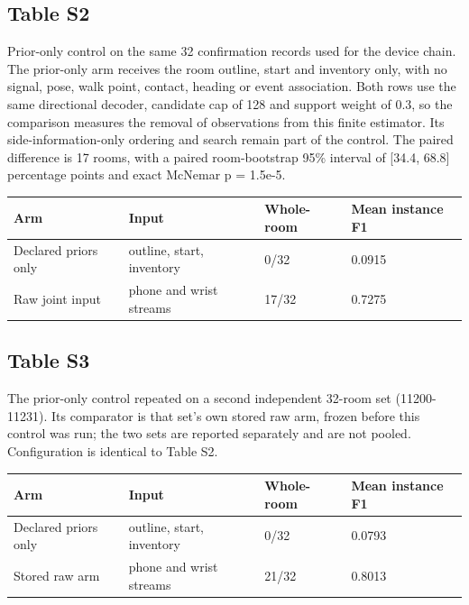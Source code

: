 \documentclass[10pt,letterpaper]{article}
\begin{document}
\begin{minipage}{\linewidth}\subsection*{Table S2}
Prior-only control on the same 32 confirmation records used for the
device chain. The prior-only arm receives the room outline, start and
inventory only, with no signal, pose, walk point, contact, heading or
event association. Both rows use the same directional decoder, candidate
cap of 128 and support weight of 0.3, so the comparison measures the
removal of observations from this finite estimator. Its
side-information-only ordering and search remain part of the control.
The paired difference is 17 rooms, with a paired room-bootstrap 95\%
interval of {[}34.4, 68.8{]} percentage points and exact McNemar p =
1.5e-5.



\begin{center}\small\begin{tabular}{@{}p{}p{}p{}p{}@{}}\toprule
\textbf{Arm} & \textbf{Input} & \textbf{Whole-room} & \textbf{Mean instance F1} \\ \midrule
Declared priors only & outline, start, inventory & 0/32 & 0.0915 \\
Raw joint input & phone and wrist streams & 17/32 & 0.7275 \\
\bottomrule\end{tabular}\end{center}
\end{minipage}\par\medskip


\begin{minipage}{\linewidth}\subsection*{Table S3}
The prior-only control repeated on a second independent 32-room set
(11200-11231). Its comparator is that set's own stored raw arm, frozen
before this control was run; the two sets are reported separately and
are not pooled. Configuration is identical to Table S2.



\begin{center}\small\begin{tabular}{@{}p{}p{}p{}p{}@{}}\toprule
\textbf{Arm} & \textbf{Input} & \textbf{Whole-room} & \textbf{Mean instance F1} \\ \midrule
Declared priors only & outline, start, inventory & 0/32 & 0.0793 \\
Stored raw arm & phone and wrist streams & 21/32 & 0.8013 \\
\bottomrule\end{tabular}\end{center}
\end{minipage}\par\medskip
\end{document}
